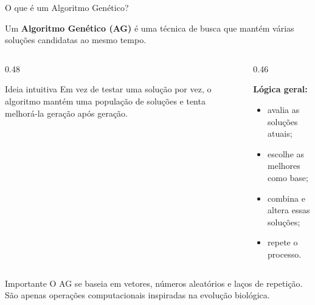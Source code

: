 \documentclass[aspectratio=169,11pt]{beamer}
\begin{document}
\begin{frame}{O que é um Algoritmo Genético?}

    Um \textbf{Algoritmo Genético (AG)} é uma técnica de busca que mantém várias soluções
    candidatas ao mesmo tempo.

    \vspace{0.28cm}

    \begin{columns}[T,onlytextwidth]

        \begin{column}{0.48\textwidth}

            \vspace{-0.18cm}

            \begin{questionbox}{Ideia intuitiva}
                Em vez de testar uma solução por vez, o algoritmo mantém uma população de
                soluções e tenta melhorá-la geração após geração.
            \end{questionbox}

        \end{column}

        \begin{column}{0.46\textwidth}

            \textbf{Lógica geral:}

            \begin{itemize}
                \item avalia as soluções atuais;
                \item escolhe as melhores como base;
                \item combina e altera essas soluções;
                \item repete o processo.
            \end{itemize}

        \end{column}

    \end{columns}

    \vspace{0.18cm}

    \begin{impactbox}{Importante}
        O AG se baseia em vetores, números aleatórios e laços de repetição. São apenas
        operações computacionais inspiradas na evolução biológica.
    \end{impactbox}

\end{frame}
\end{document}
